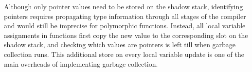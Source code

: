 Although only pointer values need to be stored on the shadow stack, identifying pointers requires propagating type information through all stages of the compiler and would still be imprecise for polymorphic functions. Instead, all local variable assignments in functions first copy the new value to the corresponding slot on the shadow stack, and checking which values are pointers is left till when garbage collection runs. This additional store on every local variable update is one of the main overheads of implementing garbage collection.


%
%


